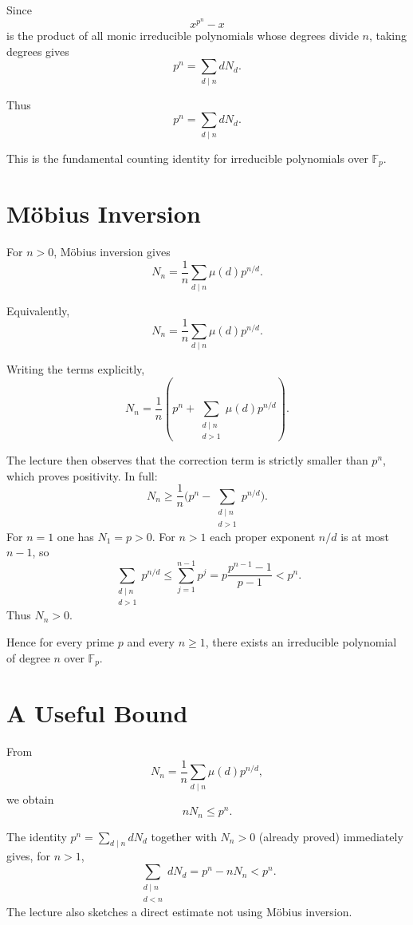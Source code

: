 \documentclass[11pt]{article}
\theoremstyle{remark}
\newcommand{\Fp}{\mathbb F_p}
\begin{document}
Since
\[
    x^{p^n}-x
\]
is the product of all monic irreducible polynomials whose degrees divide
$n$, taking degrees gives
\[
    p^n
    =
    \sum_{d\mid n} dN_d.
\]

Thus
\[
    \boxed{
    p^n=\sum_{d\mid n}dN_d.
    }
\]

This is the fundamental counting identity for irreducible polynomials
over $\Fp$.

\section{Möbius Inversion}

For $n>0$, Möbius inversion gives
\[
    N_n
    =
    \frac1n
    \sum_{d\mid n}
    \mu(d)p^{n/d}.
\]

Equivalently,
\[
    \boxed{
    N_n
    =
    \frac1n
    \sum_{d\mid n}
    \mu(d)p^{n/d}.
    }
\]

Writing the terms explicitly,
\[
    N_n
    =
    \frac1n
    \left(
        p^n
        +\sum_{\substack{d\mid n\\d>1}}
        \mu(d)p^{n/d}
    \right).
\]

The lecture then observes that the correction term is strictly smaller
than $p^n$, which proves positivity. In full:
\[
    N_n
    \ge
    \frac1n
    \Biggl(
        p^n
        -
        \sum_{\substack{d\mid n\\ d>1}}
        p^{n/d}
    \Biggr).
\]
For $n=1$ one has $N_1=p>0$. For $n>1$ each proper exponent $n/d$ is at
most $n-1$, so
\[
    \sum_{\substack{d\mid n\\ d>1}}
    p^{n/d}
    \le
    \sum_{j=1}^{n-1}p^j
    =
    p\frac{p^{n-1}-1}{p-1}
    <p^n.
\]
Thus $N_n>0$.

Hence for every prime $p$ and every $n\ge1$, there exists an irreducible
polynomial of degree $n$ over $\Fp$.

\section{A Useful Bound}

From
\[
    N_n
    =
    \frac1n
    \sum_{d\mid n}\mu(d)p^{n/d},
\]
we obtain
\[
    nN_n
    \le
    p^n.
\]

The identity $p^n=\sum_{d\mid n}dN_d$ together with $N_n>0$ (already
proved) immediately gives, for $n>1$,
\[
    \sum_{\substack{d\mid n\\d<n}}dN_d
    =
    p^n-nN_n
    <p^n.
\]
The lecture also sketches a direct estimate not using M\"obius inversion.
\end{document}
